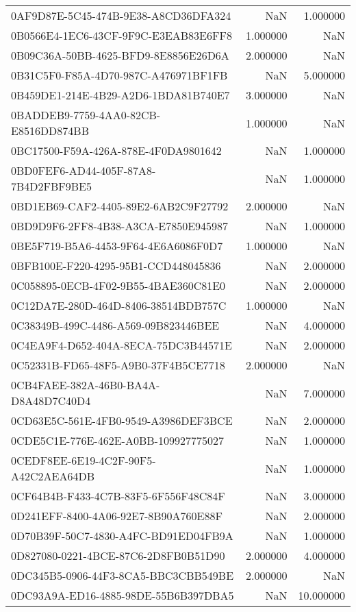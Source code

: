 \begin{tabular}{lrr}
0AF9D87E-5C45-474B-9E38-A8CD36DFA324 & NaN & 1.000000 \\
0B0566E4-1EC6-43CF-9F9C-E3EAB83E6FF8 & 1.000000 & NaN \\
0B09C36A-50BB-4625-BFD9-8E8856E26D6A & 2.000000 & NaN \\
0B31C5F0-F85A-4D70-987C-A476971BF1FB & NaN & 5.000000 \\
0B459DE1-214E-4B29-A2D6-1BDA81B740E7 & 3.000000 & NaN \\
0BADDEB9-7759-4AA0-82CB-E8516DD874BB & 1.000000 & NaN \\
0BC17500-F59A-426A-878E-4F0DA9801642 & NaN & 1.000000 \\
0BD0FEF6-AD44-405F-87A8-7B4D2FBF9BE5 & NaN & 1.000000 \\
0BD1EB69-CAF2-4405-89E2-6AB2C9F27792 & 2.000000 & NaN \\
0BD9D9F6-2FF8-4B38-A3CA-E7850E945987 & NaN & 1.000000 \\
0BE5F719-B5A6-4453-9F64-4E6A6086F0D7 & 1.000000 & NaN \\
0BFB100E-F220-4295-95B1-CCD448045836 & NaN & 2.000000 \\
0C058895-0ECB-4F02-9B55-4BAE360C81E0 & NaN & 2.000000 \\
0C12DA7E-280D-464D-8406-38514BDB757C & 1.000000 & NaN \\
0C38349B-499C-4486-A569-09B823446BEE & NaN & 4.000000 \\
0C4EA9F4-D652-404A-8ECA-75DC3B44571E & NaN & 2.000000 \\
0C52331B-FD65-48F5-A9B0-37F4B5CE7718 & 2.000000 & NaN \\
0CB4FAEE-382A-46B0-BA4A-D8A48D7C40D4 & NaN & 7.000000 \\
0CD63E5C-561E-4FB0-9549-A3986DEF3BCE & NaN & 2.000000 \\
0CDE5C1E-776E-462E-A0BB-109927775027 & NaN & 1.000000 \\
0CEDF8EE-6E19-4C2F-90F5-A42C2AEA64DB & NaN & 1.000000 \\
0CF64B4B-F433-4C7B-83F5-6F556F48C84F & NaN & 3.000000 \\
0D241EFF-8400-4A06-92E7-8B90A760E88F & NaN & 2.000000 \\
0D70B39F-50C7-4830-A4FC-BD91ED04FB9A & NaN & 1.000000 \\
0D827080-0221-4BCE-87C6-2D8FB0B51D90 & 2.000000 & 4.000000 \\
0DC345B5-0906-44F3-8CA5-BBC3CBB549BE & 2.000000 & NaN \\
0DC93A9A-ED16-4885-98DE-55B6B397DBA5 & NaN & 10.000000 \\

\end{tabular}
